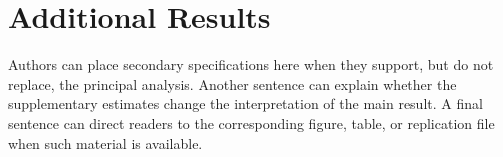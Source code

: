 \section{Additional Results}
\label{app:results}

Authors can place secondary specifications here when they support, but do not replace, the principal analysis. Another sentence can explain whether the supplementary estimates change the interpretation of the main result. A final sentence can direct readers to the corresponding figure, table, or replication file when such material is available.

